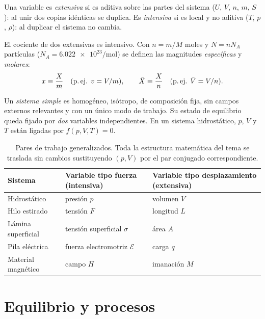 \begin{definicion}
Una variable es \emph{extensiva} si es aditiva sobre las partes del sistema ($U$, $V$, $n$, $m$, $S$):
al unir dos copias idénticas se duplica. Es \emph{intensiva} si es local y no aditiva ($T$, $p$, $\rho$):
al duplicar el sistema no cambia.
\end{definicion}

El cociente de dos extensivas es intensivo. Con $n=m/M$ moles y $N=nN_A$ partículas
($N_A=\num{6,022e23}/\mathrm{mol}$) se definen las magnitudes \emph{específicas} y \emph{molares}:
\begin{equation}\label{eq:molar}
  x\equiv\frac{X}{m}\quad(\text{p.\,ej. } v=V/m),\qquad
  \bar X\equiv\frac{X}{n}\quad(\text{p.\,ej. } \bar{V}=V/n).
\end{equation}

\begin{definicion}
Un \emph{sistema simple} es homogéneo, isótropo, de composición fija, sin campos externos
relevantes y con un único modo de trabajo. Su estado de equilibrio queda fijado por \emph{dos}
variables independientes. En un sistema hidrostático, $p$, $V$ y $T$ están ligadas por $f(p,V,T)=0$.
\end{definicion}

\begin{table}[htbp]
\centering
\caption{Pares de trabajo generalizados. Toda la estructura matemática del tema se traslada sin
cambios sustituyendo $(p,V)$ por el par conjugado correspondiente.}
\small
\begin{tabular}{lll}
\toprule
Sistema & Variable tipo fuerza (intensiva) & Variable tipo desplazamiento (extensiva)\\
\midrule
Hidrostático & presión $p$ & volumen $V$\\
Hilo estirado & tensión $F$ & longitud $L$\\
Lámina superficial & tensión superficial $\sigma$ & área $A$\\
Pila eléctrica & fuerza electromotriz $\mathcal{E}$ & carga $q$\\
Material magnético & campo $H$ & imanación $M$\\
\bottomrule
\end{tabular}
\end{table}

\section{Equilibrio y procesos}
